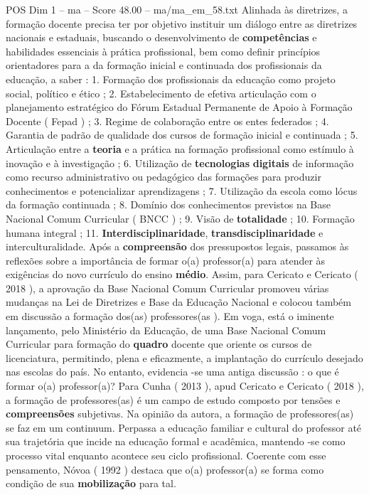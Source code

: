 \begin{textsample}{POS Dim 1 – ma – Score 48.00 – ma/ma\_em\_58.txt}
Alinhada às diretrizes, a formação docente precisa ter por objetivo instituir um diálogo entre as diretrizes nacionais e estaduais, buscando o desenvolvimento de \textbf{competências} e habilidades essenciais à prática profissional, bem como definir princípios orientadores para a da formação inicial e continuada dos profissionais da educação, a saber : 1.
Formação dos profissionais da educação como projeto social, político e ético ; 2.
Estabelecimento de efetiva articulação com o planejamento estratégico do Fórum Estadual Permanente de Apoio à Formação Docente ( Fepad ) ; 3.
Regime de colaboração entre os entes federados ; 4.
Garantia de padrão de qualidade dos cursos de formação inicial e continuada ; 5.
Articulação entre a \textbf{teoria} e a prática na formação profissional como estímulo à inovação e à investigação ; 6.
Utilização de \textbf{tecnologias} \textbf{digitais} de informação como recurso administrativo ou pedagógico das formações para produzir conhecimentos e potencializar aprendizagens ; 7.
Utilização da escola como lócus da formação continuada ; 8.
Domínio dos conhecimentos previstos na Base Nacional Comum Curricular ( BNCC ) ; 9.
Visão de \textbf{totalidade} ; 10.
Formação humana integral ; 11. \textbf{Interdisciplinaridade}, \textbf{transdisciplinaridade} e interculturalidade.
Após a \textbf{compreensão} dos pressupostos legais, passamos às reflexões sobre a importância de formar o(a) professor(a) para atender às exigências do novo currículo do ensino \textbf{médio}.
Assim, para Cericato e Cericato ( 2018 ), a aprovação da Base Nacional Comum Curricular promoveu várias mudanças na Lei de Diretrizes e Base da Educação Nacional e colocou também em discussão a formação dos(as) professores(as ).
Em voga, está o iminente lançamento, pelo Ministério da Educação, de uma Base Nacional Comum Curricular para formação do \textbf{quadro} docente que oriente os cursos de licenciatura, permitindo, plena e eficazmente, a implantação do currículo desejado nas escolas do país.
No entanto, evidencia -se uma antiga discussão : o que é formar o(a) professor(a)?
Para Cunha ( 2013 ), apud Cericato e Cericato ( 2018 ), a formação de professores(as) é um campo de estudo composto por tensões e \textbf{compreensões} subjetivas.
Na opinião da autora, a formação de professores(as) se faz em um continuum.
Perpassa a educação familiar e cultural do professor até sua trajetória que incide na educação formal e acadêmica, mantendo -se como processo vital enquanto acontece seu ciclo profissional.
Coerente com esse pensamento, Nóvoa ( 1992 ) destaca que o(a) professor(a) se forma como condição de sua \textbf{mobilização} para tal.

\end{textsample}
